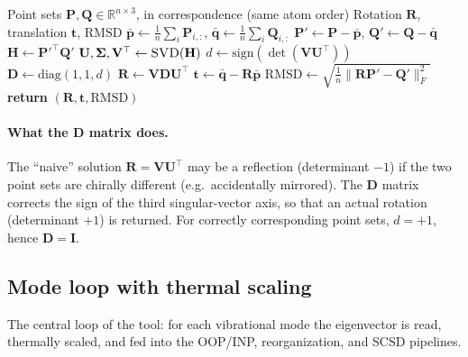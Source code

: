 \documentclass[11pt,a4paper,twoside]{article}
\theoremstyle{remark}
\begin{document}
\begin{algorithm}[H]
\caption{\textsc{KabschAlign}}
\begin{algorithmic}[1]
\Require Point sets $\mathbf{P}, \mathbf{Q} \in \mathbb{R}^{n\times 3}$,
         in correspondence (same atom order)
\Ensure Rotation $\mathbf{R}$, translation $\mathbf{t}$, RMSD
\State $\bar{\mathbf{p}} \gets \frac{1}{n}\sum_i \mathbf{P}_{i,:}$,
       $\bar{\mathbf{q}} \gets \frac{1}{n}\sum_i \mathbf{Q}_{i,:}$
\State $\mathbf{P}' \gets \mathbf{P} - \bar{\mathbf{p}}$,
       $\mathbf{Q}' \gets \mathbf{Q} - \bar{\mathbf{q}}$
\State $\mathbf{H} \gets \mathbf{P}'^\top \mathbf{Q}'$
\State $\mathbf{U}, \boldsymbol{\Sigma}, \mathbf{V}^\top \gets
       \textsc{SVD}(\mathbf{H})$
\State $d \gets \text{sign}(\det(\mathbf{V} \mathbf{U}^\top))$
\State $\mathbf{D} \gets \text{diag}(1, 1, d)$
\State $\mathbf{R} \gets \mathbf{V} \mathbf{D} \mathbf{U}^\top$
\State $\mathbf{t} \gets \bar{\mathbf{q}} - \mathbf{R} \bar{\mathbf{p}}$
\State $\text{RMSD} \gets \sqrt{\frac{1}{n} \|\mathbf{R}\mathbf{P}' -
       \mathbf{Q}'\|_F^2}$
\State \textbf{return} $(\mathbf{R}, \mathbf{t}, \text{RMSD})$
\end{algorithmic}
\end{algorithm}

\paragraph{What the $\mathbf{D}$ matrix does.}
The ``naive'' solution $\mathbf{R} = \mathbf{V}\mathbf{U}^\top$ may
be a reflection (determinant $-1$) if the two point sets are
chirally different (e.g.\ accidentally mirrored). The $\mathbf{D}$
matrix corrects the sign of the third singular-vector axis, so
that an actual rotation (determinant $+1$) is returned. For
correctly corresponding point sets, $d = +1$, hence
$\mathbf{D} = \mathbf{I}$.

\subsection{Mode loop with thermal scaling}
\label{app:pseudo-mode-loop}

The central loop of the tool: for each vibrational mode the
eigenvector is read, thermally scaled, and fed into the OOP/INP,
reorganization, and SCSD pipelines.
\end{document}
